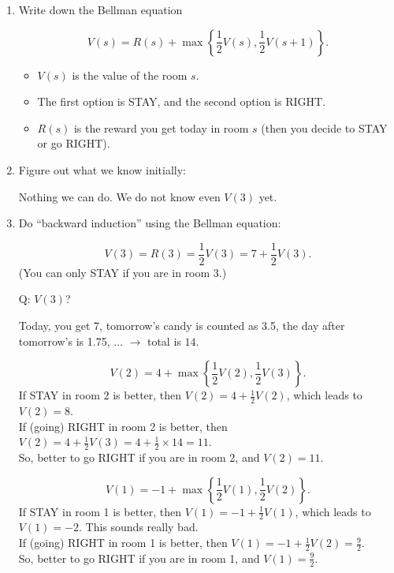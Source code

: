 \documentclass[a4paper, 12pt]{article}
\begin{document}
\begin{enumerate}

\item{Write down the Bellman equation}

\begin{equation}
V(s) = R(s) + \max \left\{ \frac{1}{2}V(s), \frac{1}{2}V(s+1) \right\}.
\end{equation}
\begin{itemize}
\item $V(s)$ is the value of the room $s$.
\item The first option is STAY, and the second option is RIGHT.
\item $R(s)$ is the reward you get today in room $s$ (then you decide to STAY or go RIGHT).
\end{itemize}

\item Figure out what we know initially:

Nothing we can do. We do not know even $V(3)$ yet.

\item Do ``backward induction'' using the Bellman equation:

\begin{equation}
V(3) = R(3) = \frac{1}{2}V(3) = 7 + \frac{1}{2} V(3).
\end{equation}
(You can only STAY if you are in room 3.)\\

\bigskip

Q: $V(3)$?
%

\bigskip

Today, you get 7, tomorrow's candy is counted as 3.5, the day after tomorrow's is 1.75, $\ldots$ $\to$ total is $14$.

\begin{equation*}
V(2) = 4 + \max \left\{ \frac{1}{2} V(2), \frac{1}{2} V(3) \right\}.
\end{equation*}
If STAY in room 2 is better, then $V(2) = 4 + \frac{1}{2} V(2)$, which leads to $V(2) = 8$.\\
If (going) RIGHT in room 2 is better, then $V(2) = 4 + \frac{1}{2} V(3) = 4 + \frac{1}{2} \times 14 = 11$.\\
So, better to go RIGHT if you are in room 2, and $V(2) = 11$.

\begin{equation*}
V(1) = -1 + \max \left\{ \frac{1}{2} V(1), \frac{1}{2} V(2) \right\}.
\end{equation*}
If STAY in room 1 is better, then $V(1) = -1 + \frac{1}{2} V(1)$, which leads to $V(1) = -2$. This sounds really bad.\\
If (going) RIGHT in room 1 is better, then $V(1) = -1 + \frac{1}{2} V(2) = \frac{9}{2}$.\\
So, better to go RIGHT if you are in room 1, and $V(1) = \frac{9}{2}$.


\end{enumerate}
\end{document}
